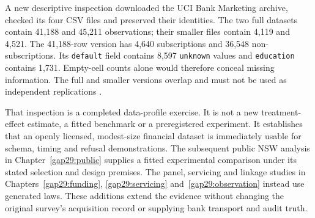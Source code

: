 A new descriptive inspection downloaded the UCI Bank Marketing archive,
checked its four CSV files and preserved their identities. The two full
datasets contain 41,188 and 45,211 observations; their smaller files
contain 4,119 and 4,521. The 41,188-row version has 4,640 subscriptions
and 36,548 non-subscriptions. Its \texttt{default} field contains 8,597
\texttt{unknown} values and \texttt{education} contains 1,731.
Empty-cell counts alone would therefore conceal missing information. The
full and smaller versions overlap and must not be used as independent
replications \citep{pd15_uci_bank,pd15_profile}.

That inspection is a completed data-profile exercise. It is not a new
treatment-effect estimate, a fitted benchmark or a preregistered
experiment. It establishes that an openly licensed, modest-size
financial dataset is immediately usable for schema, timing and refusal
demonstrations. The subsequent public NSW analysis in Chapter~\ref{gap29:public} supplies a fitted experimental comparison under its stated selection and design premises. The panel, servicing and linkage studies in Chapters~\ref{gap29:funding}, \ref{gap29:servicing} and~\ref{gap29:observation} instead use generated laws. These additions extend the evidence without changing the original survey's acquisition record or supplying bank transport and audit truth.

